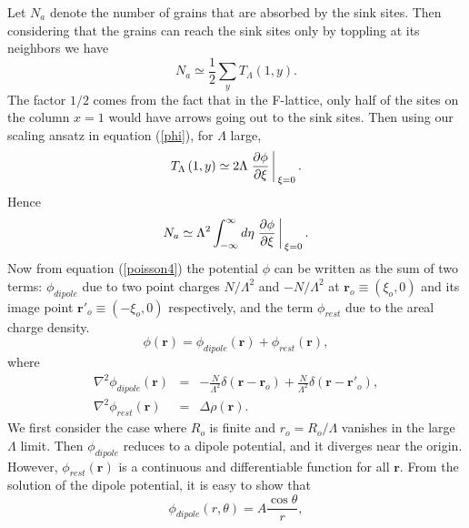 \documentclass[11pt,a4paper]{book}
\begin{document}
Let $N_{a}$ denote the number of grains that are absorbed by the sink
sites. Then considering that the grains can reach the sink sites only by toppling at its neighbors we have
\begin{equation}
N_{a}\simeq\frac{1}{2}\sum_{y}T_{\Lambda}\left( 1, y \right).
\label{na1}
\end{equation}
The factor $1/2$ comes from the fact that in the F-lattice, only half of the sites
on the column $x=1$ would have arrows going out to the sink sites. Then using
our scaling ansatz in equation (\ref{phi}), for $\Lambda$ large,
\begin{equation}
T_\Lambda\left( 1, y \right)\simeq 2 \Lambda  \left.\frac{\partial \phi}{\partial \xi}\right \arrowvert_{\xi=0}.
\label{T1}
\end{equation}
Hence
\begin{equation}
N_{a}\simeq\Lambda^{2}\int_{-\infty}^{\infty}d\eta\left.\frac{\partial \phi}{\partial \xi}\right \arrowvert_{\xi=0}.
\label{na2}
\end{equation}
Now from equation (\ref{poisson4}) the potential $\phi$ can be written as the sum of two
terms: $\phi_{dipole}$ due to two point charges $N/\Lambda^{2}$ and $-N/\Lambda^{2}$
at $\mathbf{r}_{o}\equiv\left( \xi_{o}, 0 \right)$ and its image point
$\mathbf{r}'_{o}\equiv\left( -\xi_{o}, 0 \right)$ respectively, and the term 
$\phi_{rest}$ due to the areal charge density.
\begin{equation}
\phi\left( \mathbf{r} \right)=\phi_{dipole}\left( \mathbf{r} \right)+\phi_{rest}\left( \mathbf{r} \right),
\label{phi2}
\end{equation}
where
\begin{eqnarray}
\nabla^{2}\phi_{dipole}\left( \mathbf{r} \right)&=&-\frac{N}{\Lambda^2}\delta\left( \mathbf{r} - \mathbf{r}_{o} \right) + \frac{N}{\Lambda^2}\delta\left( \mathbf{r} - \mathbf{r}'_{o} \right),\nonumber \\
\nabla^{2}\phi_{rest}\left( \mathbf{r} \right)&=&\Delta\rho\left( \mathbf{r} \right).
\label{poisson5}
\end{eqnarray}
We first consider the case where $R_{o}$ is finite and $r_{o}=R_{o}/\Lambda$ vanishes
in the large $\Lambda$ limit. Then $\phi_{dipole}$ reduces to a dipole potential,
and it diverges near the origin. However,  $\phi_{rest}\left( \mathbf{r} \right)$ is a
continuous and differentiable function for all $\mathbf{r}$. From the solution of
the dipole potential, it is easy to show that
\begin{equation}
\phi_{dipole}\left( r, \theta \right) =  A \frac{\cos\theta}{r},
\label{dipole1}
\end{equation}
\end{document}
